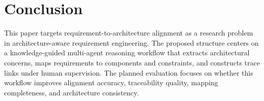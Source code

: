 \section{Conclusion}
\label{conclusion}

This paper targets requirement-to-architecture alignment as a research problem in architecture-aware requirement engineering.
The proposed structure centers on a knowledge-guided multi-agent reasoning workflow that extracts architectural concerns, maps requirements to components and constraints, and constructs trace links under human supervision.
The planned evaluation focuses on whether this workflow improves alignment accuracy, traceability quality, mapping completeness, and architecture consistency.
